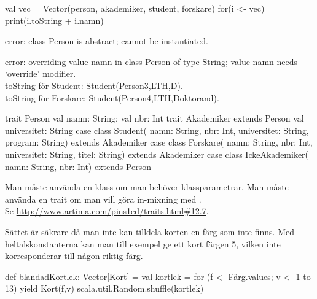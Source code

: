\Subtask
\begin{Code}
val vec = Vector(person, akademiker, student, forskare)
for(i <- vec){ print(i.toString + i.namn) }
\end{Code}

\Subtask error: class Person is abstract; cannot be instantiated.

\Subtask error: overriding value namn in class Person of type String; value namn needs `override' modifier.\\
toString för Student: Student(Person3,LTH,D). \\
toString för Forskare: Student(Person4,LTH,Doktorand).

\Subtask
\begin{Code}
trait Person {val namn: String; val nbr: Int}
trait Akademiker extends Person {val universitet: String}
case class Student(
  namn: String,
  nbr: Int,
  universitet: String,
  program: String) extends Akademiker
case class Forskare(
  namn: String,
  nbr: Int,
  universitet: String,
  titel: String) extends Akademiker
case class IckeAkademiker(
    namn: String,
    nbr: Int) extends Person
\end{Code}

\Subtask Man måste använda en klass om man behöver klassparametrar. Man måste använda en trait om man vill göra in-mixning med . \\
 Se \href{http://www.artima.com/pins1ed/traits.html\#12.7}{http://www.artima.com/pins1ed/traits.html\#12.7}.

\Task

\Subtask Sättet är säkrare då man inte kan tilldela korten en färg som inte finns. Med heltalskonstanterna kan man till exempel ge ett kort färgen 5, vilken inte korresponderar till någon riktig färg.

\Subtask {}

\Subtask
\begin{Code}
def blandadKortlek: Vector[Kort] = {
  val kortlek =
    for (f <- Färg.values; v <- 1 to 13) yield Kort(f,v)
  scala.util.Random.shuffle(kortlek)
}
\end{Code}

\Subtask {}

\ExtraTasks %

\Task

